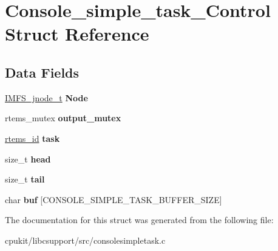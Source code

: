 \hypertarget{structConsole__simple__task__Control}{}\section{Console\+\_\+simple\+\_\+task\+\_\+\+Control Struct Reference}
\label{structConsole__simple__task__Control}
\subsection*{Data Fields}
\begin{DoxyCompactItemize}
\item 
\mbox{\label{structConsole__simple__task__Control_a9c5fea17f5c5fea489730cc3a06c6e25}} 
\mbox{\hyperlink{structIMFS__jnode__tt}{I\+M\+F\+S\+\_\+jnode\+\_\+t}} {\bfseries Node}
\item 
\mbox{\label{structConsole__simple__task__Control_af447a8a0fe91f6185ecb4d63b9dba5da}} 
rtems\+\_\+mutex {\bfseries output\+\_\+mutex}
\item 
\mbox{\label{structConsole__simple__task__Control_a39fc825dc0ebf80a7a25772a9d25d855}} 
\mbox{\hyperlink{group__ClassicTasks_gab20892b814dced7dd4e5b9bf42becd57}{rtems\+\_\+id}} {\bfseries task}
\item 
\mbox{\label{structConsole__simple__task__Control_ad14e2106ab5fb6de3af5d45c0447c073}} 
size\+\_\+t {\bfseries head}
\item 
\mbox{\label{structConsole__simple__task__Control_ac49c00e6c1e655bc0e3e721cb362a5ff}} 
size\+\_\+t {\bfseries tail}
\item 
\mbox{\label{structConsole__simple__task__Control_af0de836b31ad2de02ecebd26de11d692}} 
char {\bfseries buf} \mbox{[}C\+O\+N\+S\+O\+L\+E\+\_\+\+S\+I\+M\+P\+L\+E\+\_\+\+T\+A\+S\+K\+\_\+\+B\+U\+F\+F\+E\+R\+\_\+\+S\+I\+ZE\mbox{]}
\end{DoxyCompactItemize}


The documentation for this struct was generated from the following file\+:\begin{DoxyCompactItemize}
\item 
cpukit/libcsupport/src/consolesimpletask.\+c\end{DoxyCompactItemize}
